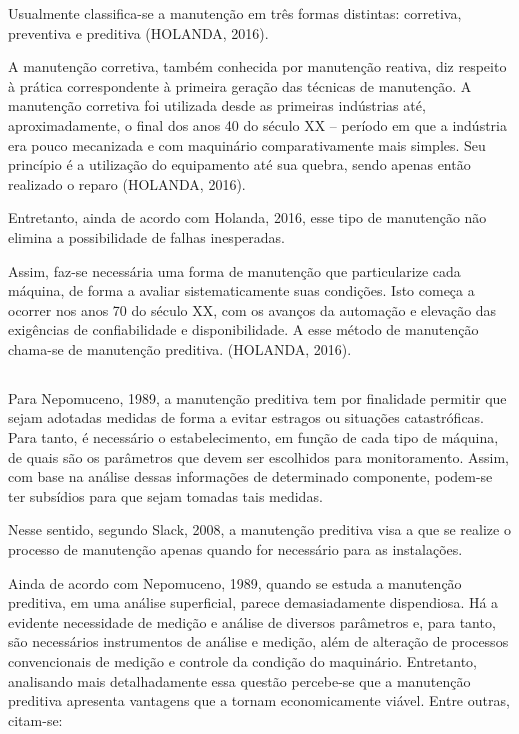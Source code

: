 \documentclass[
	12pt,				
	oneside,			
	a4paper,			
	english,			
	brazil,			
	]{abntex2ppgsi}
\begin{document}
	Usualmente classifica-se a manutenção em três formas distintas: corretiva, preventiva e preditiva (HOLANDA, 2016). 

	A manutenção corretiva, também conhecida por manutenção reativa, diz respeito à prática correspondente à primeira geração das técnicas de manutenção. A manutenção corretiva foi utilizada desde as primeiras indústrias até, aproximadamente, o final dos anos 40 do século XX – período em que a indústria era pouco mecanizada e com maquinário comparativamente mais simples. Seu princípio é a utilização do equipamento até sua quebra, sendo apenas então realizado o reparo (HOLANDA, 2016). 
	
	Entretanto, ainda de acordo com Holanda, 2016, esse tipo de manutenção não elimina a possibilidade de falhas inesperadas.

	Assim, faz-se necessária uma forma de manutenção que particularize cada máquina, de forma a avaliar sistematicamente suas condições. Isto começa a ocorrer nos anos 70 do século XX, com os avanços da automação e elevação das exigências de confiabilidade e disponibilidade. A esse método de manutenção chama-se de manutenção preditiva. (HOLANDA, 2016).  

\subsection{}

Para Nepomuceno, 1989, a manutenção preditiva tem por finalidade permitir que sejam adotadas medidas de forma a evitar estragos ou situações catastróficas. Para tanto, é necessário o estabelecimento, em função de cada tipo de máquina, de quais são os parâmetros que devem ser escolhidos para monitoramento. Assim, com base na análise dessas informações de determinado componente, podem-se ter subsídios para que sejam tomadas tais medidas. 

Nesse sentido, segundo Slack, 2008, a manutenção preditiva visa a que se realize o processo de manutenção apenas quando for necessário para as instalações. 

Ainda de acordo com Nepomuceno, 1989, quando se estuda a manutenção preditiva, em uma análise superficial, parece demasiadamente dispendiosa. Há a evidente necessidade de medição e análise de diversos parâmetros e, para tanto, são necessários instrumentos de análise e medição, além de alteração de processos convencionais de medição e controle da condição do maquinário. Entretanto, analisando mais detalhadamente essa questão percebe-se que a manutenção preditiva apresenta vantagens que a tornam economicamente viável. Entre outras, citam-se: 
\end{document}
